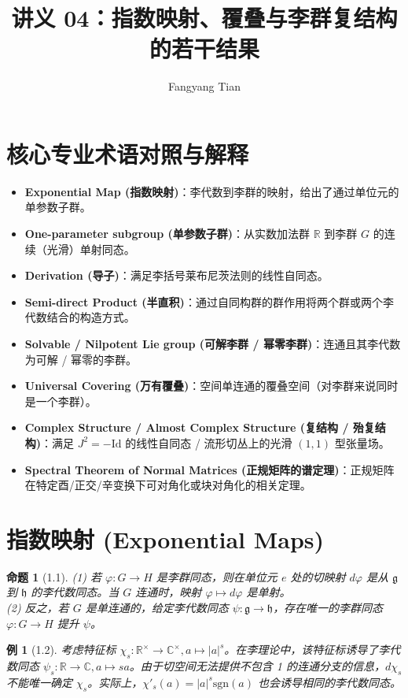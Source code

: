 \documentclass[12pt, a4paper]{ctexart}
\title{讲义 04：指数映射、覆叠与李群复结构的若干结果}
\author{Fangyang Tian}
\date{}
\newtheorem{proposition}[theorem]{命题}
\newtheorem{example}[theorem]{例}
\begin{document}
\maketitle

\section*{核心专业术语对照与解释}
\begin{itemize}
    \item \textbf{Exponential Map (指数映射)}：李代数到李群的映射，给出了通过单位元的单参数子群。
    \item \textbf{One-parameter subgroup (单参数子群)}：从实数加法群 $\mathbb{R}$ 到李群 $G$ 的连续（光滑）单射同态。
    \item \textbf{Derivation (导子)}：满足李括号莱布尼茨法则的线性自同态。
    \item \textbf{Semi-direct Product (半直积)}：通过自同构群的群作用将两个群或两个李代数结合的构造方式。
    \item \textbf{Solvable / Nilpotent Lie group (可解李群 / 幂零李群)}：连通且其李代数为可解 / 幂零的李群。
    \item \textbf{Universal Covering (万有覆叠)}：空间单连通的覆叠空间（对李群来说同时是一个李群）。
    \item \textbf{Complex Structure / Almost Complex Structure (复结构 / 殆复结构)}：满足 $J^2 = -\text{Id}$ 的线性自同态 / 流形切丛上的光滑 $(1,1)$ 型张量场。
    \item \textbf{Spectral Theorem of Normal Matrices (正规矩阵的谱定理)}：正规矩阵在特定酉/正交/辛变换下可对角化或块对角化的相关定理。
\end{itemize}

\section{指数映射 (Exponential Maps)}

\begin{proposition}[1.1]
(1) 若 $\varphi: G \to H$ 是李群同态，则在单位元 $e$ 处的切映射 $d\varphi$ 是从 $\mathfrak{g}$ 到 $\mathfrak{h}$ 的李代数同态。当 $G$ 连通时，映射 $\varphi \mapsto d\varphi$ 是单射。\\
(2) 反之，若 $G$ 是单连通的，给定李代数同态 $\psi: \mathfrak{g} \to \mathfrak{h}$，存在唯一的李群同态 $\varphi: G \to H$ 提升 $\psi$。
\end{proposition}

\begin{example}[1.2]
考虑特征标 $\chi_s: \mathbb{R}^\times \to \mathbb{C}^\times, a \mapsto |a|^s$。在李理论中，该特征标诱导了李代数同态 $\psi_s: \mathbb{R} \to \mathbb{C}, a \mapsto sa$。由于切空间无法提供不包含 1 的连通分支的信息，$d\chi_s$ 不能唯一确定 $\chi_s$。实际上，$\chi'_s(a) = |a|^s \mathrm{sgn}(a)$ 也会诱导相同的李代数同态。
\end{example}
\end{document}
